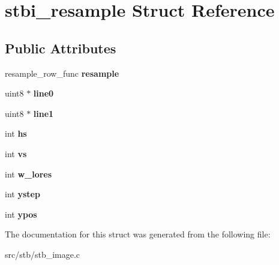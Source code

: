 \hypertarget{structstbi__resample}{}\section{stbi\+\_\+resample Struct Reference}
\label{structstbi__resample}
\subsection*{Public Attributes}
\begin{DoxyCompactItemize}
\item 
\mbox{\label{structstbi__resample_a94091463ebc5933cdaf7a813025b6e19}} 
resample\+\_\+row\+\_\+func {\bfseries resample}
\item 
\mbox{\label{structstbi__resample_a30c51395efffb663b183d7c64def6db3}} 
uint8 $\ast$ {\bfseries line0}
\item 
\mbox{\label{structstbi__resample_ac1165a6da3cf652b951056667f89b1f2}} 
uint8 $\ast$ {\bfseries line1}
\item 
\mbox{\label{structstbi__resample_a1513390ba0102364169a52ff26d5e0f2}} 
int {\bfseries hs}
\item 
\mbox{\label{structstbi__resample_a331c717f53239339c0c678f92a7bf4d5}} 
int {\bfseries vs}
\item 
\mbox{\label{structstbi__resample_a41d43c7b0d6caafbf0dfa8ef064bd2a2}} 
int {\bfseries w\+\_\+lores}
\item 
\mbox{\label{structstbi__resample_a0c479143447d103e73348c89f8b4ef1c}} 
int {\bfseries ystep}
\item 
\mbox{\label{structstbi__resample_aa1f1ad33e739f7a38fbad8752f64f983}} 
int {\bfseries ypos}
\end{DoxyCompactItemize}


The documentation for this struct was generated from the following file\+:\begin{DoxyCompactItemize}
\item 
src/stb/stb\+\_\+image.\+c\end{DoxyCompactItemize}
